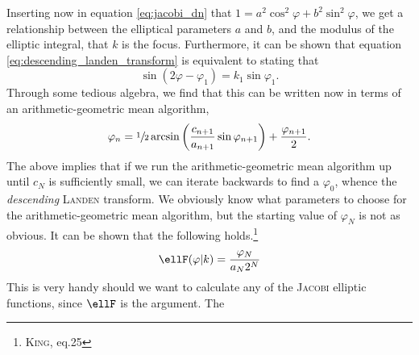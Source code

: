 Inserting now in equation \eqref{eq:jacobi_dn} that $1 = a^2 \cos^2{\varphi} + b^2 \sin^2{\varphi}$, we get a relationship between the elliptical parameters $a$ and $b$, and the modulus of the elliptic integral, that $k$ is the focus.
Furthermore, it can be shown that equation \eqref{eq:descending_landen_transform} is equivalent to stating that
\[
\sin{( 2\varphi - \varphi_1 )} = k_1 \sin{\varphi_1}.
\]
Through some tedious algebra, we find that this can be written now in terms of an arithmetic-geometric mean algorithm,
\begin{equation}\label{eq:AGM_phi}
\varphi_n = \sfrac{1}{2} \arcsin{\left( \frac{c_{n+1}}{a_{n+1}} \sin{\varphi_{n+1}} \right)} + \frac{\varphi_{n+1}}{2}.
\end{equation}
The above implies that if we run the arithmetic-geometric mean algorithm up until $c_N$ is sufficiently small, we can iterate backwards to find a $\varphi_0$, whence the \emph{descending} \textsc{Landen} transform.
We obviously know what parameters to choose for the arithmetic-geometric mean algorithm, but the starting value of $\varphi_N$ is not as obvious.
It can be shown that the following holds.\footnote{\cite{king1924direct} \textsc{King}, eq.25}
\begin{equation}\label{eq:AGM_ellF}
\ellF(\varphi \vert k) = \frac{\varphi_N}{a_N 2^N}
\end{equation}
This is very handy should we want to calculate any of the \textsc{Jacobi} elliptic functions, since $\ellF$ is the argument.
The 
